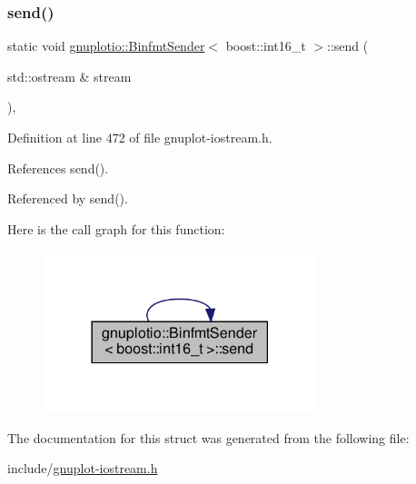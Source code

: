 \subsubsection{\texorpdfstring{send()}{send()}}
{\footnotesize\ttfamily static void \hyperlink{structgnuplotio_1_1_binfmt_sender}{gnuplotio\+::\+Binfmt\+Sender}$<$ boost\+::int16\+\_\+t $>$\+::send (\begin{DoxyParamCaption}\item[{std\+::ostream \&}]{stream }\end{DoxyParamCaption})\hspace{0.3cm}{\ttfamily [inline]}, {\ttfamily [static]}}



Definition at line 472 of file gnuplot-\/iostream.\+h.



References send().



Referenced by send().

Here is the call graph for this function\+:\nopagebreak
\begin{figure}[H]
\begin{center}
\leavevmode
\includegraphics[width=225pt]{structgnuplotio_1_1_binfmt_sender_3_01boost_1_1int16__t_01_4_a6d3c1b829c9196fa9d1f53bd78a90e34_cgraph}
\end{center}
\end{figure}


The documentation for this struct was generated from the following file\+:\begin{DoxyCompactItemize}
\item 
include/\hyperlink{gnuplot-iostream_8h}{gnuplot-\/iostream.\+h}\end{DoxyCompactItemize}
